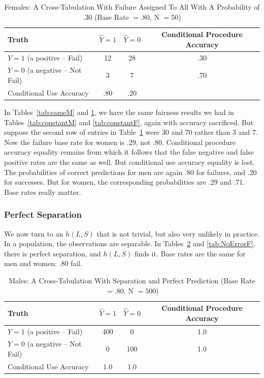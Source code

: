 \documentclass[12pt]{article}
\begin{document}
\begin{table}[htbp]
\footnotesize
\caption{Females: A Cross-Tabulation With Failure Assigned To All With A Probability of .30 (Base Rate $= .80$, N $=50$)}
\begin{center}
\begin{tabular}{|l|c|c|c|}
\hline \hline
Truth & $\hat{Y} = 1$ & $\hat{Y} = 0$ & Conditional Procedure Accuracy  \\
\hline
$ Y=1$ (a positive -- Fail) & 12 & 28  & .30 \\
\hline
$Y = 0$  (a negative -- Not Fail)& 3 & 7  & .70 \\
\hline
Conditional Use Accuracy & .80 & .20 & \\
\hline
\hline
\end{tabular}
\end{center}
\label{tab:sameF}
\end{table}

In Tables~\ref{tab:sameM} and \ref{tab:sameF}, we have the same fairness results we had in Tables~\ref{tab:constantM} and \ref{tab:constantF}, again with accuracy sacrificed. But suppose the second row of entries in Table~\ref{tab:sameF} were 30 and 70 rather than 3 and 7. Now the failure base rate for women is .29, not .80. Conditional procedure accuracy equality remains from which it follows that the false negative and false positive rates are the same as well. But conditional use accuracy equality is lost.  The probabilities of correct predictions for men are again .80 for failures, and .20 for successes. But for women, the corresponding probabilities are .29 and .71. Base rates really matter. 

\subsubsection{Perfect Separation}

We now turn to an $h(L,S)$ that is not trivial, but also very unlikely in practice. In a population, the observations are separable. In Tables~\ref{tab:NoErrorM} and \ref{tab:NoErrorF}, there is perfect separation, and  $h(L,S)$ finds it. Base rates are the same for men and women: .80 fail. 

\begin{table}[htbp]
\footnotesize
\caption{Males: A Cross-Tabulation With Separation and Perfect Prediction (Base Rate $= .80$, N $=500$)}
\begin{center}
\begin{tabular}{|l|c|c|c|}
\hline \hline
Truth & $\hat{Y} = 1$ & $\hat{Y} = 0$ & Conditional Procedure Accuracy  \\
\hline
$ Y=1$ (a positive -- Fail) & 400 & 0  & 1.0 \\
\hline
$Y = 0$  (a negative -- Not Fail)& 0 & 100  & 1.0 \\
\hline
Conditional Use Accuracy & 1.0 & 1.0 & \\
\hline
\hline
\end{tabular}
\end{center}
\label{tab:NoErrorM}
\end{table}
\end{document}
